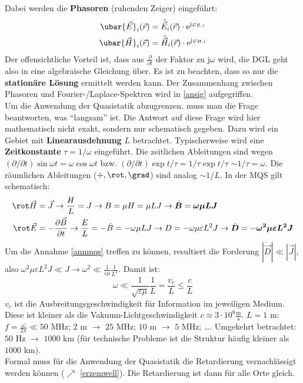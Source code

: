 		  Dabei werden die \textbf{Phasoren} (ruhenden Zeiger) eingeführt:
		        \begin{equation}\label{phasoren}\begin{split}
				        \ubar{\vec{E}}_i(\vec{r} ) &= \hat{\vec{E}}_i(\vec{r} ) \cdot  \mathrm{e}^{\mathrm{j} \varphi_{E,i}} \\
				        \ubar{\vec{H}}_i(\vec{r} ) &= \hat{\vec{H}}_i(\vec{r} ) \cdot  \mathrm{e}^{\mathrm{j} \varphi_{H,i}}
			        \end{split}\end{equation}
		  Der offensichtliche Vorteil ist, dass aus $\frac{\partial}{\partial t}$ der Faktor zu $\mathrm{j}\omega$ wird, die DGL geht also in eine algebraische Gleichung über. Es ist zu beachten, dass so nur die \textbf{stationäre Lösung} ermittelt werden kann. Der Zusammenhang zwischen Phasoren und Fourier-/Laplace-Spektren wird in \ref{ansig} aufgegriffen.\\
Um die Anwendung der Quasistatik abzugrenzen, muss man die Frage beantworten, was \enquote{langsam} ist. Die Antwort auf diese Frage wird hier mathematisch nicht exakt, sondern nur schematisch gegeben. Dazu wird ein Gebiet mit \textbf{Linearausdehnung} $L$ betrachtet. Typischerweise wird eine \textbf{Zeitkonstante} $\tau = 1/\omega$ eingeführt. Die zeitlichen Ableitungen sind wegen $(\partial/\partial t) \sin \omega t=\omega \cos \omega t$ bzw.  $(\partial/\partial t) \exp  t/\tau=1/\tau\exp  t/\tau$ $\sim 1 /\tau = \omega$. Die räumlichen Ableitungen ($\div , \rot , \grad $) sind analog $\sim 1/L$. In der MQS gilt schematisch: \begin{equation}\begin{split}
			\rot \vec{H}   &= \vec{J} \to \frac{H}{L} = J \to B  = \mu H = \mu L J \to \dot{\bm{B}}  = \bm{ \omega \mu L J}\\
\rot \vec{E}  &= -\frac{\partial \vec{B} }{\partial t} \to \frac{E}{L} = - \dot{B} = - \omega \mu L J \to D = - \omega \mu\varepsilon L^2 J \to \dot{\bm{D}} = -\bm{ \omega^2 \mu\varepsilon L^2 J}\end{split}\end{equation}	  	
Um die Annahme \ref{annmqs} treffen zu können, resultiert die Forderung $|\dot{\vec{D}}| \ll |\vec{J}|$, also $\omega^2 \mu\varepsilon L^2 J \ll J \to \omega^2 \ll \frac{1}{\varepsilon \mu} \frac{1}{L^2}$. Damit ist:
		  	\begin{equation}
		  	\boxed{\omega \ll \frac{1}{\sqrt{\varepsilon \mu}} \frac{1}{L}} = \frac{v_c}{L} \le \frac{c}{L} 
		  	\end{equation}
		  $v_c$ ist die Ausbreitungsgeschwindigkeit für Information im jeweiligen Medium. Diese ist kleiner als die Vakuum-Lichtgeschwindigkeit $c \approx 3\cdot 10^8 \mathrm{\frac{m}{s}}$. $L=1$ m: $f=\frac{\omega}{2\pi} \ll 50$ MHz; $2$ m $\to$ $25$ MHz; $10$ m $\to$ $5$ MHz; \dots. Umgekehrt betrachtet: $50$ Hz $\to$ $1000$ km (für technische Probleme ist die Struktur häufig kleiner als $1000$ km).\\
		  Formal muss für die Anwendung der Quasistatik die Retardierung vernachlässigt werden können ($\nearrow$ \ref{erzemwell}). Die Retardierung ist dann für alle Orte gleich.
